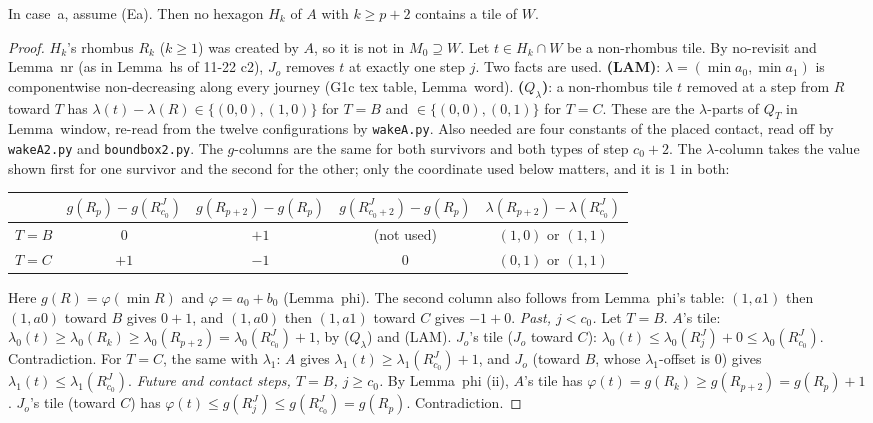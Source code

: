 \documentclass[11pt]{article}
\theoremstyle{definition}\newtheorem{definition}[theorem]{Definition}\newtheorem{remark}[theorem]{Remark}
\begin{document}
\begin{proposition}\label{prop:wake}
In case~a, assume (Ea). Then no hexagon $H_k$ of $A$ with $k\ge p+2$ contains a tile of $W$.
\end{proposition}
\begin{proof}
$H_k$'s rhombus $R_k$ ($k\ge1$) was created by $A$, so it is not in $M_0\supseteq W$. Let $t\in H_k\cap W$ be a non-rhombus tile. By no-revisit and Lemma~nr (as in Lemma~hs of 11-22 c2), $J_o$ removes $t$ at exactly one step $j$. Two facts are used. \textbf{(LAM)}: $\lambda=(\min a_0,\min a_1)$ is componentwise non-decreasing along every journey (G1c tex table, Lemma~word). \textbf{($Q_\lambda$)}: a non-rhombus tile $t$ removed at a step from $R$ toward $T$ has $\lambda(t)-\lambda(R)\in\{(0,0),(1,0)\}$ for $T=B$ and $\in\{(0,0),(0,1)\}$ for $T=C$. These are the $\lambda$-parts of $Q_T$ in Lemma~window, re-read from the twelve configurations by \texttt{wakeA.py}. Also needed are four constants of the placed contact, read off by \texttt{wakeA2.py} and \texttt{boundbox2.py}. The $g$-columns are the same for both survivors and both types of step $c_0+2$. The $\lambda$-column takes the value shown first for one survivor and the second for the other; only the coordinate used below matters, and it is $1$ in both:
\begin{center}\small\begin{tabular}{lcccc}\toprule
& $g(R_p)-g(R^J_{c_0})$ & $g(R_{p+2})-g(R_p)$ & $g(R^J_{c_0+2})-g(R_p)$ & $\lambda(R_{p+2})-\lambda(R^J_{c_0})$\\\midrule
$T=B$ & $0$ & $+1$ & (not used) & $(1,0)$ or $(1,1)$\\
$T=C$ & $+1$ & $-1$ & $0$ & $(0,1)$ or $(1,1)$\\\bottomrule
\end{tabular}\end{center}
Here $g(R)=\varphi(\min R)$ and $\varphi=a_0+b_0$ (Lemma~phi). The second column also follows from Lemma~phi's table: $(1,a1)$ then $(1,a0)$ toward $B$ gives $0+1$, and $(1,a0)$ then $(1,a1)$ toward $C$ gives $-1+0$.
\emph{Past, $j<c_0$.} Let $T=B$. $A$'s tile: $\lambda_0(t)\ge\lambda_0(R_k)\ge\lambda_0(R_{p+2})=\lambda_0(R^J_{c_0})+1$, by ($Q_\lambda$) and (LAM). $J_o$'s tile ($J_o$ toward $C$): $\lambda_0(t)\le\lambda_0(R^J_j)+0\le\lambda_0(R^J_{c_0})$. Contradiction. For $T=C$, the same with $\lambda_1$: $A$ gives $\lambda_1(t)\ge\lambda_1(R^J_{c_0})+1$, and $J_o$ (toward $B$, whose $\lambda_1$-offset is $0$) gives $\lambda_1(t)\le\lambda_1(R^J_{c_0})$.
\emph{Future and contact steps, $T=B$, $j\ge c_0$.} By Lemma~phi (ii), $A$'s tile has $\varphi(t)=g(R_k)\ge g(R_{p+2})=g(R_p)+1$. $J_o$'s tile (toward $C$) has $\varphi(t)\le g(R^J_j)\le g(R^J_{c_0})=g(R_p)$. Contradiction.

\end{proof}
\end{document}
